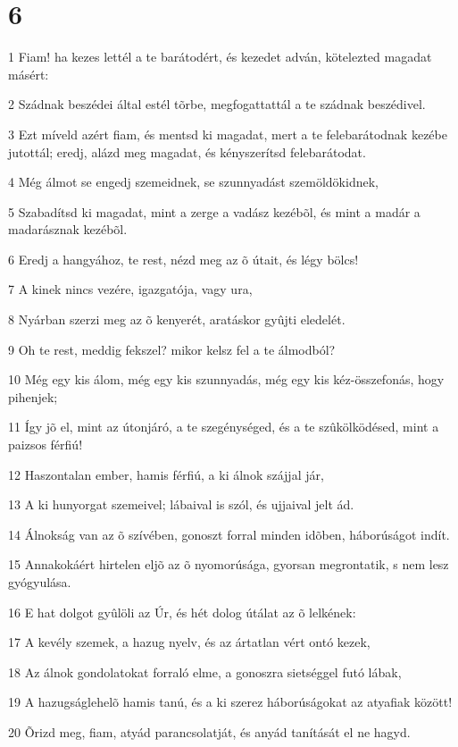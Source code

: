 \chapter{6}

\par 1 Fiam! ha kezes lettél a te barátodért, és kezedet adván, kötelezted magadat másért:
\par 2 Szádnak beszédei által estél tõrbe, megfogattattál a te szádnak beszédivel.
\par 3 Ezt míveld azért fiam, és mentsd ki magadat, mert a te felebarátodnak kezébe jutottál; eredj, alázd meg magadat, és kényszerítsd felebarátodat.
\par 4 Még álmot se engedj szemeidnek, se szunnyadást szemöldökidnek,
\par 5 Szabadítsd ki magadat, mint a zerge a vadász kezébõl, és mint a madár a madarásznak kezébõl.
\par 6 Eredj a hangyához, te rest, nézd meg az õ útait, és légy bölcs!
\par 7 A kinek nincs vezére, igazgatója, vagy ura,
\par 8 Nyárban szerzi meg az õ kenyerét, aratáskor gyûjti eledelét.
\par 9 Oh te rest, meddig fekszel? mikor kelsz fel a te álmodból?
\par 10 Még egy kis álom, még egy kis szunnyadás, még egy kis kéz-összefonás, hogy pihenjek;
\par 11 Így jõ el, mint az útonjáró, a te szegénységed, és a te szûkölködésed, mint a paizsos férfiú!
\par 12 Haszontalan ember, hamis férfiú, a ki álnok szájjal jár,
\par 13 A ki hunyorgat szemeivel; lábaival is szól, és ujjaival jelt ád.
\par 14 Álnokság van az õ szívében, gonoszt forral minden idõben, háborúságot indít.
\par 15 Annakokáért hirtelen eljõ az õ nyomorúsága, gyorsan megrontatik, s nem lesz gyógyulása.
\par 16 E hat dolgot gyûlöli az Úr, és hét dolog útálat az õ lelkének:
\par 17 A kevély szemek, a hazug nyelv, és az ártatlan vért ontó kezek,
\par 18 Az álnok gondolatokat forraló elme, a gonoszra sietséggel futó lábak,
\par 19 A hazugságlehelõ hamis tanú, és a ki szerez háborúságokat az atyafiak között!
\par 20 Õrizd meg, fiam, atyád parancsolatját, és anyád tanítását el ne hagyd.
